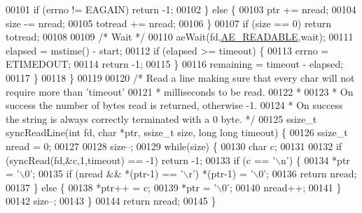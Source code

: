 \begin{DoxyCode}
00101             \textcolor{keywordflow}{if} (errno != EAGAIN) \textcolor{keywordflow}{return} -1;
00102         \} \textcolor{keywordflow}{else} \{
00103             ptr += nread;
00104             size -= nread;
00105             totread += nread;
00106         \}
00107         \textcolor{keywordflow}{if} (size == 0) \textcolor{keywordflow}{return} totread;
00108 
00109         \textcolor{comment}{/* Wait */}
00110         aeWait(fd,\hyperlink{ae_8h_a7a9a2162d007d09739955b4e55c65bf3}{AE\_READABLE},wait);
00111         elapsed = mstime() - start;
00112         \textcolor{keywordflow}{if} (elapsed >= timeout) \{
00113             errno = ETIMEDOUT;
00114             \textcolor{keywordflow}{return} -1;
00115         \}
00116         remaining = timeout - elapsed;
00117     \}
00118 \}
00119 
00120 \textcolor{comment}{/* Read a line making sure that every char will not require more than 'timeout'}
00121 \textcolor{comment}{ * milliseconds to be read.}
00122 \textcolor{comment}{ *}
00123 \textcolor{comment}{ * On success the number of bytes read is returned, otherwise -1.}
00124 \textcolor{comment}{ * On success the string is always correctly terminated with a 0 byte. */}
00125 ssize\_t syncReadLine(\textcolor{keywordtype}{int} fd, \textcolor{keywordtype}{char} *ptr, ssize\_t size, \textcolor{keywordtype}{long} \textcolor{keywordtype}{long} timeout) \{
00126     ssize\_t nread = 0;
00127 
00128     size--;
00129     \textcolor{keywordflow}{while}(size) \{
00130         \textcolor{keywordtype}{char} c;
00131 
00132         \textcolor{keywordflow}{if} (syncRead(fd,&c,1,timeout) == -1) \textcolor{keywordflow}{return} -1;
00133         \textcolor{keywordflow}{if} (c == \textcolor{stringliteral}{'\(\backslash\)n'}) \{
00134             *ptr = \textcolor{stringliteral}{'\(\backslash\)0'};
00135             \textcolor{keywordflow}{if} (nread && *(ptr-1) == \textcolor{stringliteral}{'\(\backslash\)r'}) *(ptr-1) = \textcolor{stringliteral}{'\(\backslash\)0'};
00136             \textcolor{keywordflow}{return} nread;
00137         \} \textcolor{keywordflow}{else} \{
00138             *ptr++ = c;
00139             *ptr = \textcolor{stringliteral}{'\(\backslash\)0'};
00140             nread++;
00141         \}
00142         size--;
00143     \}
00144     \textcolor{keywordflow}{return} nread;
00145 \}
\end{DoxyCode}
